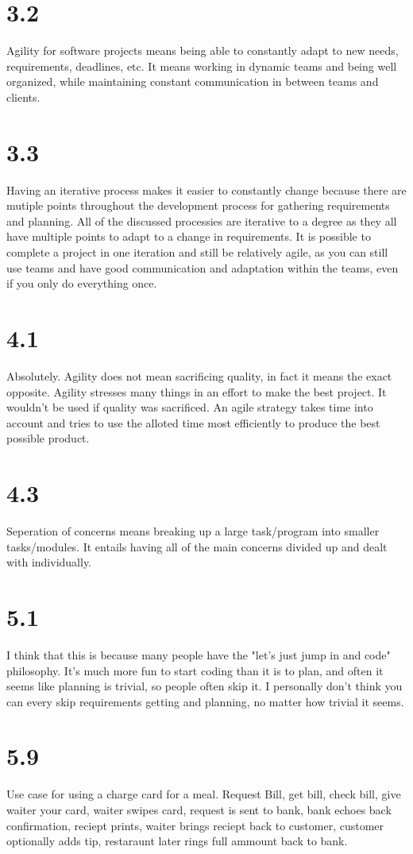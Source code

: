 \documentclass{article}
\begin{document}
\section*{3.2}
Agility for software projects means being able to constantly adapt to new needs, requirements, deadlines, etc.  It means working in dynamic teams and being well organized, while maintaining constant communication in between teams and clients.  
\section*{3.3}
Having an iterative process makes it easier to constantly change because there are mutiple points throughout the development process for gathering requirements and planning.  All of the discussed processies are iterative to a degree as they all have multiple points to adapt to a change in requirements.  It is possible to complete a project in one iteration and still be relatively agile, as you can still use teams and have good communication and adaptation within the teams, even if you only do everything once.  
\section*{4.1}
Absolutely.  Agility does not mean sacrificing quality, in fact it means the exact opposite.  Agility stresses many things in an effort to make the best project.  It wouldn't be used if quality was sacrificed.  An agile strategy takes time into account and tries to use the alloted time most efficiently to produce the best possible product.
\section*{4.3}
Seperation of concerns means breaking up a large task/program into smaller tasks/modules.  It entails having all of the main concerns divided up and dealt with individually.  
\section*{5.1}
I think that this is because many people have the "let's just jump in and code" philosophy.  It's much more fun to start coding than it is to plan, and often it seems like planning is trivial, so people often skip it.  I personally don't think you can every skip requirements getting and planning, no matter how trivial it seems.
\section*{5.9}
Use case for using a charge card for a meal.  Request Bill, get bill, check bill, give waiter your card, waiter swipes card, request is sent to bank, bank echoes back confirmation, reciept prints, waiter brings reciept back to customer, customer optionally adds tip, restaraunt later rings full ammount back to bank.
\end{document}
